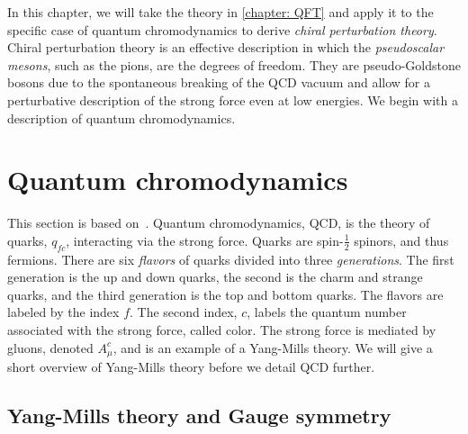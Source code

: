 In this chapter, we will take the theory in \autoref{chapter: QFT} and apply it to the specific case of quantum chromodynamics to derive \emph{chiral perturbation theory}.
Chiral perturbation theory is an effective description in which the \emph{pseudoscalar mesons}, such as the pions, are the degrees of freedom.
They are pseudo-Goldstone bosons due to the spontaneous breaking of the QCD vacuum and allow for a perturbative description of the strong force even at low energies.
We begin with a description of quantum chromodynamics.


\section{Quantum chromodynamics}
\label{section:qcd}

This section is based on~\autocite{peskinIntroductionQuantumField1995,schererIntroductionChiralPerturbation2002,schwartzQuantumFieldTheory2013}.
Quantum chromodynamics, QCD, is the theory of quarks, $q_{fc}$, interacting via the strong force.
Quarks are spin-$\frac{1}{2}$ spinors, and thus fermions.
There are six \emph{flavors} of quarks divided into three \emph{generations}.
The first generation is the up and down quarks, the second is the charm and strange quarks, and the third generation is the top and bottom quarks.
The flavors are labeled by the index $f$.
The second index, $c$, labels the quantum number associated with the strong force, called color.
The strong force is mediated by gluons, denoted $A_\mu^c$, and is an example of a Yang-Mills theory.
We will give a short overview of Yang-Mills theory before we detail QCD further.


\subsection{Yang-Mills theory and Gauge symmetry}
\label{subsection: yang-mills theory and gauge symmetry}


